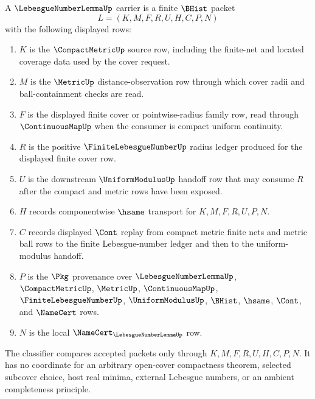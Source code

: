 \begin{definition}
\label{def:lebesgue-number-lemma-carrier}
A $\LebesgueNumberLemmaUp$ carrier is a finite $\BHist$ packet
$$
L=(K,M,F,R,U,H,C,P,N)
$$
with the following displayed rows:
\begin{enumerate}
\item $K$ is the $\CompactMetricUp$ source row, including the finite-net and located coverage data used by the cover request.
\item $M$ is the $\MetricUp$ distance-observation row through which cover radii and ball-containment checks are read.
\item $F$ is the displayed finite cover or pointwise-radius family row, read through $\ContinuousMapUp$ when the consumer is compact uniform continuity.
\item $R$ is the positive $\FiniteLebesgueNumberUp$ radius ledger produced for the displayed finite cover row.
\item $U$ is the downstream $\UniformModulusUp$ handoff row that may consume $R$ after the compact and metric rows have been exposed.
\item $H$ records componentwise $\hsame$ transport for $K,M,F,R,U,P,N$.
\item $C$ records displayed $\Cont$ replay from compact metric finite nets and metric ball rows to the finite Lebesgue-number ledger and then to the uniform-modulus handoff.
\item $P$ is the $\Pkg$ provenance over $\LebesgueNumberLemmaUp$, $\CompactMetricUp$, $\MetricUp$, $\ContinuousMapUp$, $\FiniteLebesgueNumberUp$, $\UniformModulusUp$, $\BHist$, $\hsame$, $\Cont$, and $\NameCert$ rows.
\item $N$ is the local $\NameCert_{\LebesgueNumberLemmaUp}$ row.
\end{enumerate}
The classifier compares accepted packets only through $K,M,F,R,U,H,C,P,N$. It has no coordinate for an arbitrary open-cover compactness theorem, selected subcover choice, host real minima, external Lebesgue numbers, or an ambient completeness principle.
\end{definition}

